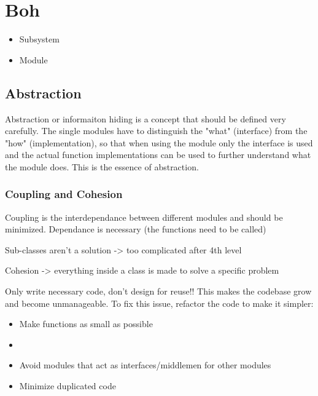 % 
\chapter{Boh}

\begin{itemize}
\item Subsystem
\item Module
\end{itemize}

\section{Abstraction}
Abstraction or informaiton hiding is a concept that should be defined very carefully. The single modules have to distinguish the "what" (interface) from the "how" (implementation), so that when using the module only the interface is used and the actual function implementations can be used to further understand what the module does. This is the essence of abstraction.  

\subsection{Coupling and Cohesion}
Coupling is the interdependance between different modules and should be minimized. Dependance is necessary (the functions need to be called)

Sub-classes aren't a solution -> too complicated after 4th level

Cohesion -> everything inside a class is made to solve a specific problem

Only write necessary code, don't design for reuse!! This makes the codebase grow and become unmanageable. 
To fix this issue, refactor the code to make it simpler: 
\begin{itemize}
\item Make functions as small as possible
  \item 
    \item Avoid modules that act as interfaces/middlemen for other modules
    \item Minimize duplicated code
\end{itemize}
% 

